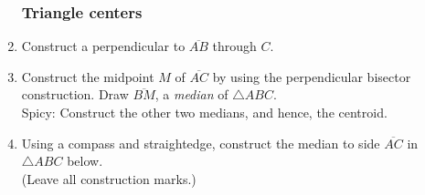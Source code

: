 \begin{enumerate}
\newpage
\subsubsection*{Triangle centers}

  \item Construct a perpendicular to $\overline{AB}$ through $C$.\\
    \vspace{1cm}
    \begin{center}
    \end{center}
    \vspace{4cm}

  \item Construct the midpoint $M$ of $\overline{AC}$ by using the perpendicular bisector construction. Draw $\overline{BM}$, a \emph{median} of $\triangle ABC$.\\
  Spicy: Construct the other two medians, and hence, the centroid.
    \begin{center}
  \end{center} %

  \item Using  a  compass  and  straightedge,  construct  the  median  to  side $\overline{AC}$ in $\triangle ABC$ below.\\ (Leave all construction marks.)
    \begin{center}
    \end{center}


\end{enumerate}
